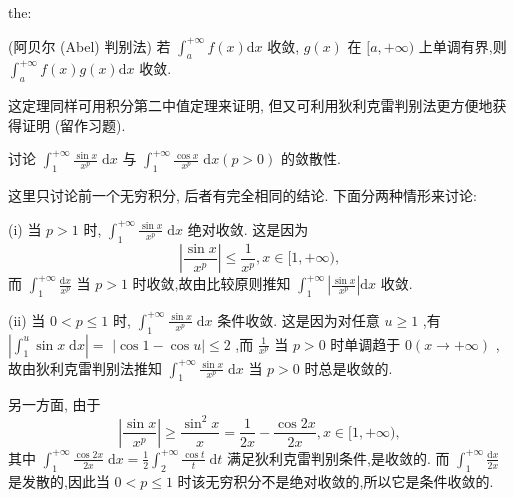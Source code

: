 \begin{theorem}{}{the:}

\end{theorem}
 (阿贝尔 (Abel) 判别法) 若 \({\int }_{a}^{+\infty }f\left( x\right) \mathrm{d}x\) 收敛, \(g\left( x\right)\) 在 \(\lbrack a, + \infty )\) 上单调有界,则 \({\int }_{a}^{+\infty }f\left( x\right) g\left( x\right) \mathrm{d}x\) 收敛.

这定理同样可用积分第二中值定理来证明, 但又可利用狄利克雷判别法更方便地获得证明 (留作习题).

\begin{example}

\end{example}
讨论 \({\int }_{1}^{+\infty }\frac{\sin x}{{x}^{p}}\mathrm{\;d}x\) 与 \({\int }_{1}^{+\infty }\frac{\cos x}{{x}^{p}}\mathrm{\;d}x\left( {p > 0}\right)\) 的敛散性.

\begin{solution}

\end{solution}
这里只讨论前一个无穷积分, 后者有完全相同的结论. 下面分两种情形来讨论:

(i) 当 \(p > 1\) 时, \({\int }_{1}^{+\infty }\frac{\sin x}{{x}^{p}}\mathrm{\;d}x\) 绝对收敛. 这是因为
\[
\left| \frac{\sin x}{{x}^{p}}\right|  \leq  \frac{1}{{x}^{p}},x \in  \lbrack 1, + \infty ),
\]
而 \({\int }_{1}^{+\infty }\frac{\mathrm{d}x}{{x}^{p}}\) 当 \(p > 1\) 时收敛,故由比较原则推知 \({\int }_{1}^{+\infty }\left| \frac{\sin x}{{x}^{p}}\right| \mathrm{d}x\) 收敛.

(ii) 当 \(0 < p \leq  1\) 时, \({\int }_{1}^{+\infty }\frac{\sin x}{{x}^{p}}\mathrm{\;d}x\) 条件收敛. 这是因为对任意 \(u \geq  1\) ,有 \(\left| {{\int }_{1}^{u}\sin x\mathrm{\;d}x}\right|  =\)  \(\left| {\cos 1 - \cos u}\right|  \leq  2\) ,而 \(\frac{1}{{x}^{p}}\) 当 \(p > 0\) 时单调趋于 \(0\left( {x \rightarrow   + \infty }\right)\) ,故由狄利克雷判别法推知 \({\int }_{1}^{+\infty }\frac{\sin x}{{x}^{p}}\mathrm{\;d}x\) 当 \(p > 0\) 时总是收敛的.

另一方面, 由于
\[
\left| \frac{\sin x}{{x}^{p}}\right|  \geq  \frac{{\sin }^{2}x}{x} = \frac{1}{2x} - \frac{\cos {2x}}{2x},x \in  \lbrack 1, + \infty ),
\]
其中 \({\int }_{1}^{+\infty }\frac{\cos {2x}}{2x}\mathrm{\;d}x = \frac{1}{2}{\int }_{2}^{+\infty }\frac{\cos t}{t}\mathrm{\;d}t\) 满足狄利克雷判别条件,是收敛的. 而 \({\int }_{1}^{+\infty }\frac{\mathrm{d}x}{2x}\) 是发散的,因此当 \(0 < p \leq  1\) 时该无穷积分不是绝对收敛的,所以它是条件收敛的.

